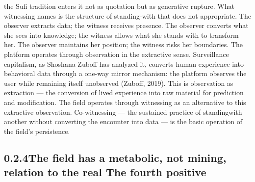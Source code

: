 the Sufi tradition enters it not as quotation but as generative rupture. What witnessing names is the structure of standing-with that does not appropriate. The observer extracts data; the witness receives presence. The observer converts what she sees into knowledge; the witness allows what she stands with to transform her. The observer maintains her position; the witness risks her boundaries. The platform operates through observation in the extractive sense. Surveillance capitalism, as Shoshana Zuboff has analyzed it, converts human experience into behavioral data through a one-way mirror mechanism: the platform observes the user while remaining itself unobserved (Zuboff, 2019). This is observation as extraction — the conversion of lived experience into raw material for prediction and modification. The field operates through witnessing as an alternative to this extractive observation. Co-witnessing — the sustained practice of standingwith another without converting the encounter into data — is the basic operation of the field’s persistence.

\subsection{0.2.4\quad The field has a metabolic, not mining, relation to the real The fourth positive}

